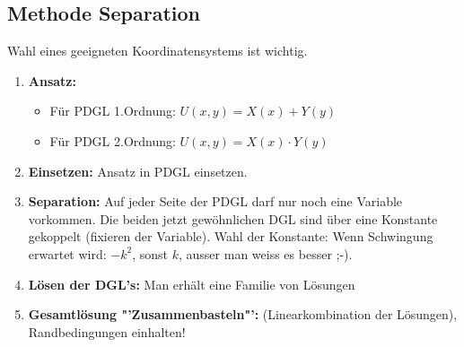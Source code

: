 \subsection{Methode Separation}
Wahl eines geeigneten Koordinatensystems ist wichtig.


\begin{enumerate}
\item \textbf{Ansatz: }
	\begin{itemize}
		\item Für PDGL 1.Ordnung: $U(x,y)=X(x) + Y(y)$
		\item Für PDGL 2.Ordnung: $U(x,y)=X(x) \cdot Y(y)$ 
	\end{itemize}
\item \textbf{Einsetzen: } Ansatz in PDGL einsetzen.
\item \textbf{Separation: } Auf jeder Seite der PDGL darf nur noch eine Variable vorkommen. Die beiden jetzt gewöhnlichen DGL sind über eine Konstante gekoppelt (fixieren der Variable). Wahl der Konstante: Wenn Schwingung erwartet wird: $-k^2$, sonst $k$, ausser man weiss es besser ;-).
\item \textbf{Lösen der DGL's: } Man erhält eine Familie von Lösungen	
\item \textbf{Gesamtlösung "'Zusammenbasteln"': } (Linearkombination der Lösungen), Randbedingungen einhalten!
\end{enumerate}

